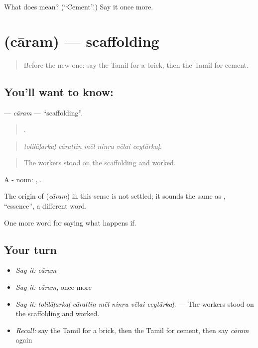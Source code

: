 \begin{tcolorbox}[breakable,colback=teal!4,colframe=teal!35!black,title={Before you move on}]
What does  mean? (\textquotedblleft{}Cement\textquotedblright{}.) Say it once more.
\end{tcolorbox}
\section[\texorpdfstring{\ta{சாரம்} (cāram)}{சாரம் (cāram)}]{ (cāram) — scaffolding}

\label{lesson:TA-C550-caram}



\begin{quote}
Before the new one: say the Tamil for a brick, then the Tamil for cement.
\end{quote}

\subsection*{You'll want to know: }
\textbf{} — \emph{cāram} — \textquotedblleft{}scaffolding\textquotedblright{}.

\begin{quote}
     .
\end{quote}

\begin{quote}
\emph{toḻilāḷarkaḷ cārattiṉ mēl niṉṟu vēlai ceytārkaḷ.}
\end{quote}

\begin{quote}
The workers stood on the scaffolding and worked.
\end{quote}

A - noun: ,  .

\begin{cousinweb}
The origin of \textbf{} (\emph{cāram}) in this sense is not settled; it sounds the same as , \textquotedblleft{}essence\textquotedblright{}, a different word.
\end{cousinweb}

\begin{grammarlens}[title={What you've built}]
One more word for saying what happens if.
\end{grammarlens}

\subsection*{Your turn}
\begin{itemize}
\raggedright
  \item \emph{Say it:} \emph{cāram}
  \item \emph{Say it:} \emph{cāram}, once more
  \item \emph{Say it:} \emph{toḻilāḷarkaḷ cārattiṉ mēl niṉṟu vēlai ceytārkaḷ.} — The workers stood on the scaffolding and worked.
  \item \emph{Recall:} say the Tamil for a brick, then the Tamil for cement, then say \emph{cāram} again
\end{itemize}

